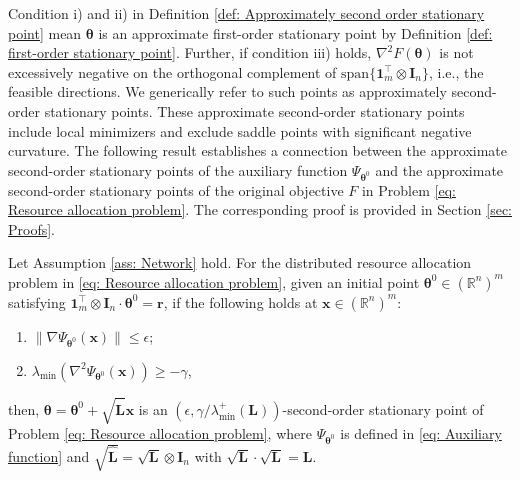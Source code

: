 \documentclass{siamart251216}
\begin{document}
Condition i) and ii) in Definition \ref{def: Approximately second order stationary point} mean $\boldsymbol{\theta}$ is an approximate first-order stationary point by Definition \ref{def: first-order stationary point}. Further, if condition iii) holds, $\nabla^{2} F(\boldsymbol{\theta})$ is not excessively negative on the orthogonal complement of $\text{span}\{\bm{1}_{m}^{\top} \otimes \mathbf{I}_{n}\}$, i.e., the feasible directions. We generically refer to such points as approximately second-order stationary points. These approximate second-order stationary points include local minimizers and exclude saddle points with significant negative curvature. The following result establishes  a connection between the approximate second-order stationary points of the auxiliary function $\Psi_{\boldsymbol{\theta}^{0}}$ and the approximate second-order stationary points of the original objective $F$ in Problem \eqref{eq: Resource allocation problem}. The corresponding proof is provided in Section \ref{sec: Proofs}.

\begin{proposition}
\label{pro: Second order relations}
    Let Assumption \ref{ass: Network} hold. For the distributed resource allocation problem in \eqref{eq: Resource allocation problem}, given an initial point $\boldsymbol{\theta}^{0} \in (\mathbb{R}^{n})^{m}$ satisfying $\bm{1}_{m}^{\top} \otimes \mathbf{I}_{n} \cdot \boldsymbol{\theta}^{0} = \bm{r}$, if the following holds at $\mathbf{x} \in (\mathbb{R}^{n})^{m}$:
    \begin{enumerate}
    \renewcommand{\labelenumi}{\roman{enumi})}
        \item $\|\nabla \Psi_{\boldsymbol{\theta}^{0}}(\mathbf{x})\| \le \epsilon$;
        \item $\lambda_{\min} (\nabla^{2} \Psi_{\boldsymbol{\theta}^{0}}(\mathbf{x})) \ge -\gamma$,
    \end{enumerate}
    then, $\boldsymbol{\theta} = \boldsymbol{\theta}^{0} + \sqrt{\hat{\mathbf{L}}} \mathbf{x}$ is an $(\epsilon,\gamma/\lambda_{\min}^{+}(\mathbf{L}))$-second-order stationary point of Problem \eqref{eq: Resource allocation problem}, where $\Psi_{\boldsymbol{\theta}^{0}}$ is defined in \eqref{eq: Auxiliary function} and $\sqrt{\hat{\mathbf{L}}} = \sqrt{\mathbf{L}}\otimes \mathbf{I}_{n}$ with $\sqrt{\mathbf{L}} \cdot \sqrt{\mathbf{L}} = \mathbf{L}$.
\end{proposition}
\end{document}
